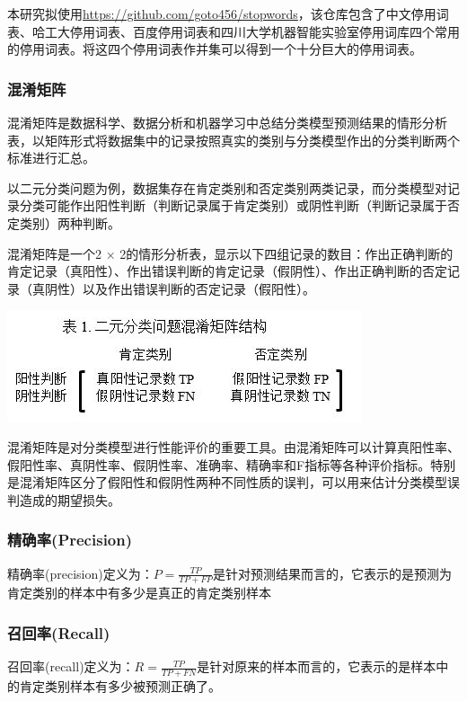 \documentclass[UTF8]{ctexart}
\begin{document}
本研究拟使用\url{https://github.com/goto456/stopwords}，该仓库包含了中文停用词表、哈工大停用词表、百度停用词表和四川大学机器智能实验室停用词库四个常用的停用词表。将这四个停用词表作并集可以得到一个十分巨大的停用词表。
\subsubsection{混淆矩阵}
混淆矩阵是数据科学、数据分析和机器学习中总结分类模型预测结果的情形分析表，以矩阵形式将数据集中的记录按照真实的类别与分类模型作出的分类判断两个标准进行汇总。

以二元分类问题为例，数据集存在肯定类别和否定类别两类记录，而分类模型对记录分类可能作出阳性判断（判断记录属于肯定类别）或阴性判断（判断记录属于否定类别）两种判断。

混淆矩阵是一个2 × 2的情形分析表，显示以下四组记录的数目：作出正确判断的肯定记录（真阳性）、作出错误判断的肯定记录（假阴性）、作出正确判断的否定记录（真阴性）以及作出错误判断的否定记录（假阳性）。
\begin{center}
\includegraphics[scale=0.6]{pictures/v2-026440fdfe0a0a799a135cc534cb61e2_hd.jpg}
\end{center}

混淆矩阵是对分类模型进行性能评价的重要工具。由混淆矩阵可以计算真阳性率、假阳性率、真阴性率、假阴性率、准确率、精确率和F指标等各种评价指标。特别是混淆矩阵区分了假阳性和假阴性两种不同性质的误判，可以用来估计分类模型误判造成的期望损失。\cite{conmat}
\subsubsection{精确率(Precision)}
精确率(precision)定义为：$P=\frac{T P}{T P+F P}$是针对预测结果而言的，它表示的是预测为肯定类别的样本中有多少是真正的肯定类别样本
\subsubsection{召回率(Recall)}
召回率(recall)定义为：$R=\frac{T P}{T P+F N}$是针对原来的样本而言的，它表示的是样本中的肯定类别样本有多少被预测正确了。
\end{document}
